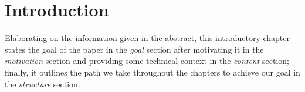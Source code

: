 \chapter{Introduction}
Elaborating on the information given in the abstract,
this introductory chapter
states the goal of the paper in the \textit{goal} section
after motivating it in the \textit{motivation} section
and providing some technical context in the \textit{content} section;
finally, it outlines the path we take throughout the chapters
to achieve our goal in the \textit{structure} section.









